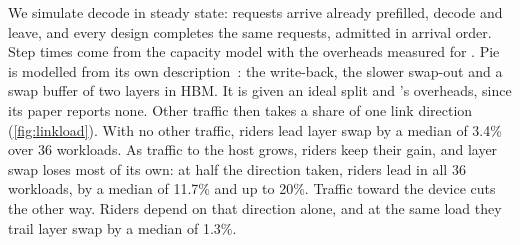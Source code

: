 We simulate decode in steady state: requests arrive already prefilled, decode
and leave, and every design completes the same requests, admitted in arrival
order. Step times come from the capacity model with the overheads measured for
\sysname{}. Pie is modelled from its own description~\cite{pie}: the
write-back, the slower swap-out and a swap buffer of two layers in HBM. It is
given an ideal split and \sysname{}'s overheads, since its paper reports none.
Other traffic then takes a share of one link direction (\cref{fig:linkload}).
With no other traffic, riders lead layer swap by a median of 3.4\% over 36
workloads. As traffic to the host grows, riders keep their gain, and layer
swap loses most of its own: at half the direction taken, riders lead in all 36
workloads, by a median of 11.7\% and up to 20\%. Traffic toward the device
cuts the other way. Riders depend on that direction alone, and at the same
load they trail layer swap by a median of 1.3\%.

